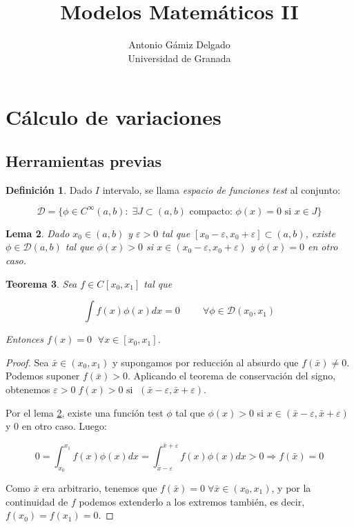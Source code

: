 \documentclass[12pt]{article}
\newtheorem{theorem}{Teorema}[section]
\newtheorem{lemma}[theorem]{Lema}
\theoremstyle{definition}
\newtheorem{definition}[theorem]{Definición}
\theoremstyle{remark}
\newcommand{\continuas}[1][]{C^{ #1 }[x_0,x_1]}
\newcommand{\soportecompacto}{\mathcal{D}(x_0,x_1)}
\newcommand{\xcero}{(x_0,x_1)}
\begin{document}
\title{Modelos Matemáticos II}
\author{Antonio Gámiz Delgado\\ Universidad de Granada} 
 
\maketitle

\section{Cálculo de variaciones}

\subsection{Herramientas previas}

\begin{definition}
\label{funcionestest}
Dado $I$ intervalo, se llama \textit{espacio de funciones test} al conjunto:

\[
\mathcal{D} = \{\phi\in C^{\infty}(a,b): \; \exists J\subset(a,b) \text{ compacto: } \phi(x)=0 \text{ si } x \in J\}
\]
\end{definition}

\begin{lemma}
\label{existanciaphi}
Dado $x_0\in(a,b)$ y $\varepsilon>0$ tal que $[x_0-\varepsilon, x_0+\varepsilon]\subset(a,b)$, existe $\phi\in\mathcal{D}(a,b)$ tal que $\phi(x)>0$ si $x\in(x_0-\varepsilon,x_0+\varepsilon)$ y $\phi(x)=0$ en otro caso.
\end{lemma}

\begin{theorem}
\label{theorem:1.3}
Sea $f\in \continuas$ tal que

\[
\int f(x)\phi(x)dx=0 \hspace{1cm} \forall \phi \in \soportecompacto
\]

Entonces $f(x)=0 \;$  $\forall x\in [x_0,x_1]$.

\end{theorem}

\begin{proof}

Sea $\bar{x}\in \xcero$ y supongamos por reducción al absurdo que $f(\bar{x})\neq 0$. Podemos suponer $f(\bar{x})>0$. Aplicando el teorema de conservación del signo, obtenemos $\varepsilon>0 \; f(x)>0 \text{ si } \; (\bar{x}-\varepsilon,\bar{x}+\varepsilon)$.

Por el lema \ref{existanciaphi}, existe una función test $\phi$ tal que $\phi(x)>0$ si $x\in(\bar{x}-\varepsilon, \bar{x}+\varepsilon)$ y $0$ en otro caso. Luego:

\[
0=\int_{x_0}^{x_1}f(x)\phi(x)dx=\int_{\bar{x}-\varepsilon}^{\bar{x}+\varepsilon}f(x)\phi(x)dx>0 \Rightarrow f(\bar{x})=0
\]

Como $\bar{x}$ era arbitrario, tenemos que $f(\bar{x})=0 \; \forall \bar{x}\in\xcero$, y por la continuidad de $f$ podemos extenderlo a los extremos también, es decir, $f(x_0)=f(x_1)=0$.

\end{proof}
\end{document}
